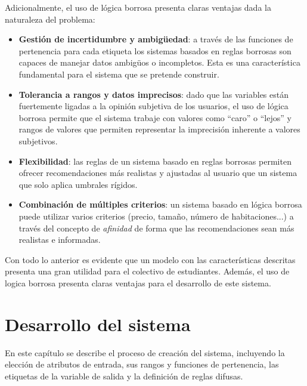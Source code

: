\documentclass[12pt]{report} %
\begin{document}
        Adicionalmente, el uso de lógica borrosa presenta claras ventajas dada
        la naturaleza del problema:
        \begin{itemize} \item \textbf{Gestión de incertidumbre y ambigüedad}: a
        través de las funciones de pertenencia para cada etiqueta los sistemas
        basados en reglas borrosas son capaces de manejar datos ambigüos o
        incompletos. Esta es una característica fundamental para el sistema que
        se pretende construir.

            \item \textbf{Tolerancia a rangos y datos imprecisos}: dado que las
            variables están fuertemente ligadas a la opinión subjetiva de los
            usuarios, el uso de lógica borrosa permite que el sistema trabaje
            con valores como ``caro'' o ``lejos'' y rangos de valores que
            permiten representar la imprecisión inherente a valores subjetivos.

            \item \textbf{Flexibilidad}: las reglas de un sistema basado en
            reglas borrosas permiten ofrecer recomendaciones más realistas y
            ajustadas al usuario que un sistema que solo aplica umbrales
            rígidos.

            \item \textbf{Combinación de múltiples criterios}: un sistema
            basado en lógica borrosa puede utilizar varios criterios (precio,
            tamaño, número de habitaciones...) a través del concepto de
            \textit{afinidad} de forma que las recomendaciones sean más
            realistas e informadas.

        \end{itemize}

        Con todo lo anterior es evidente que un modelo con las características
        descritas presenta una gran utilidad para el colectivo de estudiantes.
        Además, el uso de logica borrosa presenta claras ventajas para el
        desarrollo de este sistema.

    \chapter{Desarrollo del sistema}
    \label{chap:desarrollo}

        En este capítulo se describe el proceso de creación del sistema,
        incluyendo la elección de atributos de entrada, sus rangos y funciones
        de pertenencia, las etiquetas de la variable de salida y la definición
        de reglas difusas. 
        
\end{document}
